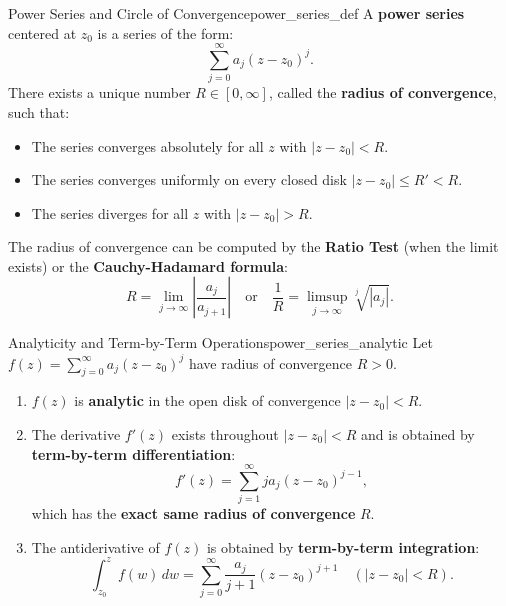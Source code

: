 \begin{definition}{Power Series and Circle of Convergence}{power_series_def}
A \textbf{power series} centered at $z_0$ is a series of the form:
\begin{equation}
\sum_{j=0}^\infty a_j (z - z_0)^j.
\end{equation}
There exists a unique number $R \in [0, \infty]$, called the \textbf{radius of convergence}, such that:
\begin{itemize}
    \item The series converges absolutely for all $z$ with $|z - z_0| < R$.
    \item The series converges uniformly on every closed disk $|z - z_0| \le R' < R$.
    \item The series diverges for all $z$ with $|z - z_0| > R$.
\end{itemize}
The radius of convergence can be computed by the \textbf{Ratio Test} (when the limit exists) or the \textbf{Cauchy-Hadamard formula}:
\begin{equation}
R = \lim_{j \to \infty} \left| \frac{a_j}{a_{j+1}} \right| \quad \text{or} \quad \frac{1}{R} = \limsup_{j \to \infty} \sqrt[j]{|a_j|}.
\end{equation}
\end{definition}

\begin{theorem}{Analyticity and Term-by-Term Operations}{power_series_analytic}
Let $f(z) = \sum_{j=0}^\infty a_j (z - z_0)^j$ have radius of convergence $R > 0$.
\begin{enumerate}
    \item $f(z)$ is \textbf{analytic} in the open disk of convergence $|z - z_0| < R$.
    \item The derivative $f'(z)$ exists throughout $|z - z_0| < R$ and is obtained by \textbf{term-by-term differentiation}:
    \begin{equation}
    f'(z) = \sum_{j=1}^\infty j a_j (z - z_0)^{j-1},
    \end{equation}
    which has the \textbf{exact same radius of convergence} $R$.
    \item The antiderivative of $f(z)$ is obtained by \textbf{term-by-term integration}:
    \begin{equation}
    \int_{z_0}^z f(w)\, dw = \sum_{j=0}^\infty \frac{a_j}{j+1} (z - z_0)^{j+1} \quad (|z - z_0| < R).
    \end{equation}
\end{enumerate}
\end{theorem}


